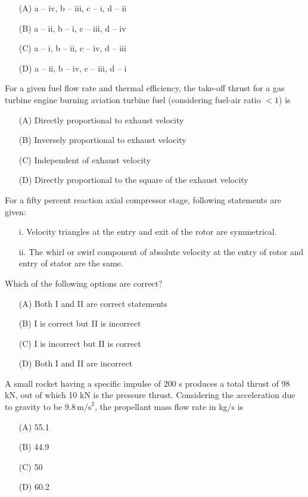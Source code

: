 \begin{itemize}
    \item[(A)] a -- iv, b -- iii, c -- i, d -- ii
    \item[(B)] a -- ii, b -- i, c -- iii, d -- iv
    \item[(C)] a -- i, b -- ii, c -- iv, d -- iii
    \item[(D)] a -- ii, b -- iv, c -- iii, d -- i
\end{itemize}

\vspace{0.5cm}
\item For a given fuel flow rate and thermal efficiency, the take-off thrust for a gas turbine engine burning aviation turbine fuel (considering fuel-air ratio $<1$) is

\begin{itemize}
    \item[(A)] Directly proportional to exhaust velocity
    \item[(B)] Inversely proportional to exhaust velocity
    \item[(C)] Independent of exhaust velocity
    \item[(D)] Directly proportional to the square of the exhaust velocity
\end{itemize}
\vspace{0.5cm}
\item For a fifty percent reaction axial compressor stage, following statements are given:
\begin{enumerate}
    \item[i.] Velocity triangles at the entry and exit of the rotor are symmetrical.
    \item[ii.] The whirl or swirl component of absolute velocity at the entry of rotor and entry of stator are the same.
\end{enumerate}
Which of the following options are correct?
\begin{itemize}
    \item[(A)] Both I and II are correct statements
    \item[(B)] I is correct but II is incorrect
    \item[(C)] I is incorrect but II is correct
    \item[(D)] Both I and II are incorrect
\end{itemize}

\vspace{0.5cm}
\item A small rocket having a specific impulse of 200 s produces a total thrust of 98 kN, out of which 10 kN is the pressure thrust. Considering the acceleration due to gravity to be $9.8 \, \text{m/s}^2$, the propellant mass flow rate in kg/s is
\begin{itemize}
    \item[(A)] 55.1
    \item[(B)] 44.9
    \item[(C)] 50
    \item[(D)] 60.2
\end{itemize}

